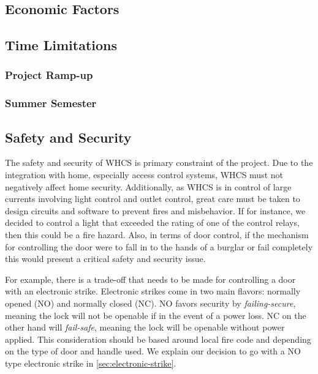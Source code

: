 

\subsection{Economic Factors}

\subsection{Time Limitations}

\subsubsection{Project Ramp-up}

\subsubsection{Summer Semester}

\subsection{Safety and Security}
\label{sec:safety-sec}

The safety and security of WHCS is primary constraint of the project. Due to
the integration with home, especially access control systems, WHCS must not
negatively affect home security. Additionally, as WHCS is in control of large
currents involving light control and outlet control, great care must be taken
to design circuits and software to prevent fires and misbehavior. If for
instance, we decided to control a light that exceeded the rating of one of the
control relays, then this could be a fire hazard. Also, in terms of door
control, if the mechanism for controlling the door were to fall in to the hands
of a burglar or fail completely this would present a critical safety and
security issue.

For example, there is a trade-off that needs to be made for controlling a door
with an electronic strike. Electronic strikes come in two main flavors:
normally opened (NO) and normally closed (NC). NO favors security by
\emph{failing-secure}, meaning the lock will not be openable if in the event of
a power loss. NC on the other hand will \emph{fail-safe}, meaning the lock will
be openable without power applied. This consideration should be based around
local fire code and depending on the type of door and handle used. We explain
our decision to go with a NO type electronic strike in
\autoref{sec:electronic-strike}.

